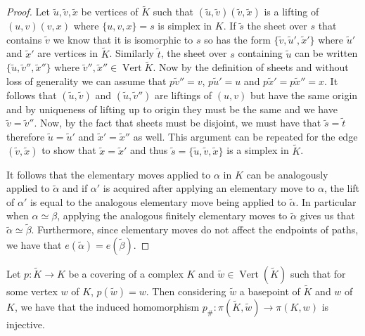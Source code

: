 \begin{proof}
  Let $\tilde{u},\tilde{v},\tilde{x}$ be vertices of $\tilde{K}$ such that $(\tilde{u},\tilde{v})(\tilde{v},\tilde{x})$ is a lifting of $(u,v)(v,x)$ where $\{u,v,x\} = s$ is  simplex in $K$. If $\tilde{s}$ the sheet over $s$ that contains $\tilde{v}$ we know that it is isomorphic to $s$ so has the form $\{\tilde{v}, \tilde{u}', \tilde{x}' \}$ where $\tilde{u}'$ and $\tilde{x}'$ are vertices in $\tilde{K}$. Similarly $\tilde{t}$, the sheet over $s$ containing $\tilde{u}$ can be written $\{\tilde{u},\tilde{v}'',\tilde{x}''\}$ where $\tilde{v}'',\tilde{x}'' \in \operatorname{Vert}{\tilde{K}}$. Now by the definition of sheets and without loss of generality we can assume that $p\tilde{v}'' = v$, $p\tilde{u}' = u$ and $p\tilde{x}' = p\tilde{x}'' = x$. It follows that $(\tilde{u},\tilde{v})$ and $(\tilde{u},\tilde{v}'')$ are liftings of $(u,v)$ but have the same origin and by uniqueness of lifting up to origin they must be the same and we have $\tilde{v} = \tilde{v}''$. Now, by the fact that sheets must be disjoint, we must have that $\tilde{s} = \tilde{t}$ therefore $\tilde{u} = \tilde{u}'$ and $\tilde{x}' = \tilde{x}''$ as well. This argument can be repeated for the edge $(\tilde{v},\tilde{x})$ to show that $\tilde{x} = \tilde{x}'$ and thus $\tilde{s} = \{\tilde{u},\tilde{v},\tilde{x}\}$ is a simplex in $\tilde{K}$.

  It follows that the elementary moves applied to $\alpha$ in $K$ can be analogously applied to $\tilde{\alpha}$ and if $\alpha'$ is acquired after applying an elementary move to $\alpha$, the lift of $\alpha'$ is equal to the analogous elementary move being applied to $\tilde{\alpha}$. In particular when $\alpha \simeq \beta$, applying the analogous finitely elementary moves to $\tilde{\alpha}$ gives us that $\tilde{\alpha} \simeq \tilde{\beta}$. Furthermore, since elementary moves do not affect the endpoints of paths, we have that $e(\tilde{\alpha}) = e(\tilde{\beta})$.
\end{proof}

\begin{theorem}
  \label{thm:injection}
  Let $p:\tilde{K} \rightarrow K$ be a covering of a complex $K$ and $\tilde{w} \in \operatorname{Vert}(\tilde{K})$ such that for some vertex $w$ of $K$, $p(\tilde{w}) = w$. Then considering $\tilde{w}$ a basepoint of $\tilde{K}$ and $w$ of $K$, we have that the induced homomorphism $p_{\#} : \pi(\tilde{K},\tilde{w}) \rightarrow \pi(K,w)$ is injective.
\end{theorem}


